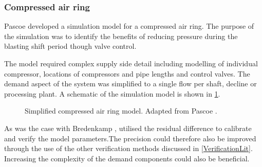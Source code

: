 \subsubsection{Compressed air ring}
Pascoe \cite{Pascoe2016Masters} developed a simulation model for a compressed air ring. The purpose of the simulation was to identify the benefits of reducing pressure during the blasting shift period though valve control.\par 
 The model required complex supply side detail including modelling of individual compressor, locations of compressors and pipe lengths and control valves. The demand aspect of the system was simplified to a single flow per shaft, decline or processing plant. A schematic of the simulation model is shown in \cref{fig:Pascoe  model}.
 \par
\begin{figure}[h!]
	\centering
	\caption[Simplified compressed air ring model.]{Simplified compressed air ring model. Adapted from Pascoe \cite{Pascoe2016Masters}.}
	\label{fig:Pascoe  model}
\end{figure}
As was the case with Bredenkamp \cite{Bredenkamp2013Masters}, \cite{Pascoe2016Masters} utilised the residual difference to calibrate and verify the model parameters.The precision could therefore also be improved through the use of the other verification methods discussed in \cref{VerificationLit}. Increasing the complexity of the demand components could also be beneficial.

